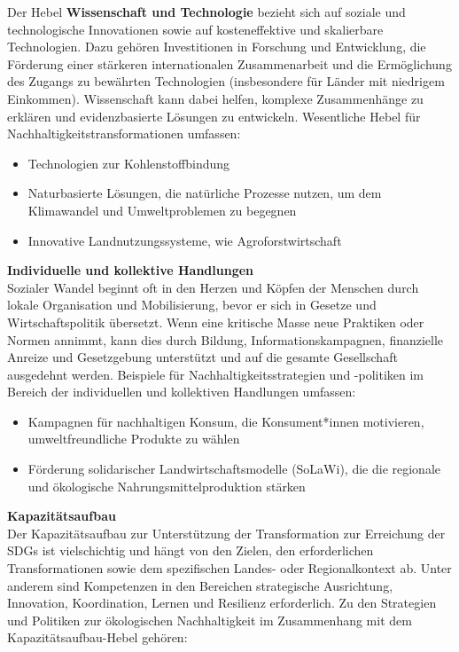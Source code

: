 \documentclass[
  nswissgerman,
  a4paper,
  openany]{book}
\begin{document}
Der Hebel \textbf{Wissenschaft und Technologie} bezieht sich auf soziale
und technologische Innovationen sowie auf kosteneffektive und
skalierbare Technologien. Dazu gehören Investitionen in Forschung und
Entwicklung, die Förderung einer stärkeren internationalen
Zusammenarbeit und die Ermöglichung des Zugangs zu bewährten
Technologien (insbesondere für Länder mit niedrigem Einkommen).
Wissenschaft kann dabei helfen, komplexe Zusammenhänge zu erklären und
evidenzbasierte Lösungen zu entwickeln. Wesentliche Hebel für
Nachhaltigkeitstransformationen umfassen:

\begin{itemize}
\item
  Technologien zur Kohlenstoffbindung
\item
  Naturbasierte Lösungen, die natürliche Prozesse nutzen, um dem
  Klimawandel und Umweltproblemen zu begegnen
\item
  Innovative Landnutzungssysteme, wie Agroforstwirtschaft
\end{itemize}

\textbf{Individuelle und kollektive Handlungen}\\
Sozialer Wandel beginnt oft in den Herzen und Köpfen der Menschen durch
lokale Organisation und Mobilisierung, bevor er sich in Gesetze und
Wirtschaftspolitik übersetzt. Wenn eine kritische Masse neue Praktiken
oder Normen annimmt, kann dies durch Bildung, Informationskampagnen,
finanzielle Anreize und Gesetzgebung unterstützt und auf die gesamte
Gesellschaft ausgedehnt werden. Beispiele für Nachhaltigkeitsstrategien
und -politiken im Bereich der individuellen und kollektiven Handlungen
umfassen:

\begin{itemize}
\item
  Kampagnen für nachhaltigen Konsum, die Konsument*innen motivieren,
  umweltfreundliche Produkte zu wählen
\item
  Förderung solidarischer Landwirtschaftsmodelle (SoLaWi), die die
  regionale und ökologische Nahrungsmittelproduktion stärken
\end{itemize}

\textbf{Kapazitätsaufbau}\\
Der Kapazitätsaufbau zur Unterstützung der Transformation zur Erreichung
der SDGs ist vielschichtig und hängt von den Zielen, den erforderlichen
Transformationen sowie dem spezifischen Landes- oder Regionalkontext ab.
Unter anderem sind Kompetenzen in den Bereichen strategische
Ausrichtung, Innovation, Koordination, Lernen und Resilienz
erforderlich. Zu den Strategien und Politiken zur ökologischen
Nachhaltigkeit im Zusammenhang mit dem Kapazitätsaufbau-Hebel gehören:
\end{document}
